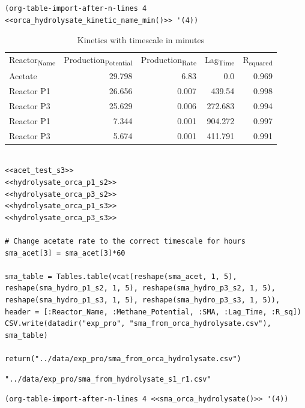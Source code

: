 \documentclass[11pt]{article}
\begin{document}
\begin{verbatim}
(org-table-import-after-n-lines 4 <<orca_hydrolysate_kinetic_name_min()>> '(4))
\end{verbatim}

\begin{table}[htbp]
\caption{Kinetics with timescale in minutes}
\centering
\begin{tabular}{lrrrr}
Reactor\textsubscript{Name} & Production\textsubscript{Potential} & Production\textsubscript{Rate} & Lag\textsubscript{Time} & R\textsubscript{squared}\\[0pt]
Acetate & 29.798 & 6.83 & 0.0 & 0.969\\[0pt]
Reactor P1 & 26.656 & 0.007 & 439.54 & 0.998\\[0pt]
Reactor P3 & 25.629 & 0.006 & 272.683 & 0.994\\[0pt]
Reactor P1 & 7.344 & 0.001 & 904.272 & 0.997\\[0pt]
Reactor P3 & 5.674 & 0.001 & 411.791 & 0.991\\[0pt]
\end{tabular}
\end{table}

\begin{verbatim}

<<acet_test_s3>>
<<hydrolysate_orca_p1_s2>>
<<hydrolysate_orca_p3_s2>>
<<hydrolysate_orca_p1_s3>>
<<hydrolysate_orca_p3_s3>>

# Change acetate rate to the correct timescale for hours
sma_acet[3] = sma_acet[3]*60

sma_table = Tables.table(vcat(reshape(sma_acet, 1, 5), reshape(sma_hydro_p1_s2, 1, 5), reshape(sma_hydro_p3_s2, 1, 5), reshape(sma_hydro_p1_s3, 1, 5), reshape(sma_hydro_p3_s3, 1, 5)), header = [:Reactor_Name, :Methane_Potential, :SMA, :Lag_Time, :R_sq])
CSV.write(datadir("exp_pro", "sma_from_orca_hydrolysate.csv"), sma_table)

return("../data/exp_pro/sma_from_orca_hydrolysate.csv")
\end{verbatim}

\begin{verbatim}
"../data/exp_pro/sma_from_hydrolysate_s1_r1.csv"
\end{verbatim}


\begin{verbatim}
(org-table-import-after-n-lines 4 <<sma_orca_hydrolysate()>> '(4))
\end{verbatim}
\end{document}
